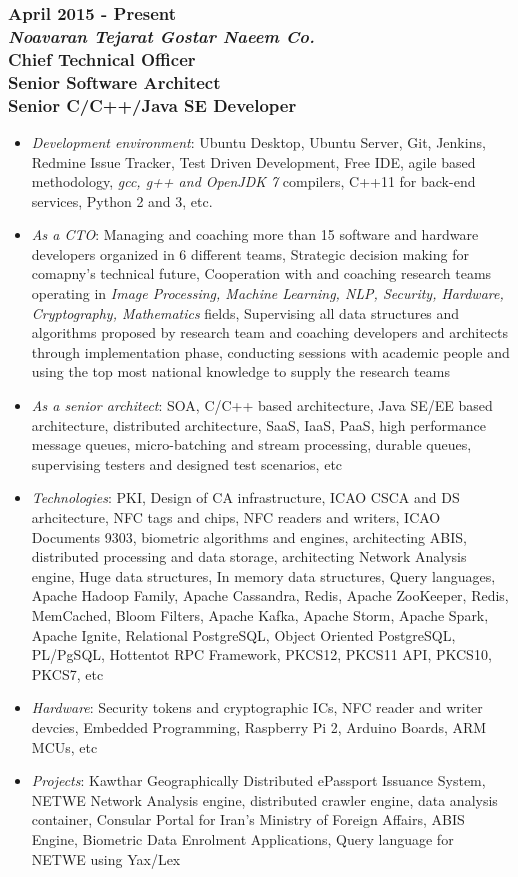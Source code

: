 \documentclass[10pt,a4paper]{article}
\begin{document}
\subsubsection{\textnormal {April 2015 - Present} \\ \textnormal {\textit {Noavaran Tejarat Gostar Naeem Co.}} \\ Chief Technical Officer \\ Senior Software Architect \\ Senior C/C++/Java SE Developer}
  \setlength{\leftskip}{0.5cm}
  \setlength{\rightskip}{1cm}
  \begin{itemize}
    \setlength{\rightskip}{1cm}
    \setlength\itemsep{0em}
    \item \small \textit {Development environment}: Ubuntu Desktop, Ubuntu Server, Git, Jenkins, Redmine Issue Tracker, Test Driven Development, Free IDE, agile based methodology, \textit {gcc, g++ and OpenJDK 7} compilers, C++11 for back-end services, Python 2 and 3, etc.
    \item \small \textit {As a CTO}: Managing and coaching more than 15 software and hardware developers organized in 6 different teams, Strategic decision making for comapny's technical future, Cooperation with and coaching research teams operating in \textit {Image Processing, Machine Learning, NLP, Security, Hardware, Cryptography, Mathematics} fields, Supervising all data structures and algorithms proposed by research team and coaching developers and architects through implementation phase, conducting sessions with academic people and using the top most national knowledge to supply the research teams
    \item \small \textit {As a senior architect}: SOA, C/C++ based architecture, Java SE/EE based architecture, distributed architecture, SaaS, IaaS, PaaS, high performance message queues, micro-batching and stream processing, durable queues, supervising testers and designed test scenarios, etc
    \item \small \textit {Technologies}: PKI, Design of CA infrastructure, ICAO CSCA and DS arhcitecture, NFC tags and chips, NFC readers and writers, ICAO Documents 9303, biometric algorithms and engines, architecting ABIS, distributed processing and data storage, architecting Network Analysis engine, Huge data structures, In memory data structures, Query languages, Apache Hadoop Family, Apache Cassandra, Redis, Apache ZooKeeper, Redis, MemCached, Bloom Filters, Apache Kafka, Apache Storm, Apache Spark, Apache Ignite, Relational PostgreSQL, Object Oriented PostgreSQL, PL/PgSQL, Hottentot RPC Framework, PKCS12, PKCS11 API, PKCS10, PKCS7, etc
    \item \small \textit {Hardware}: Security tokens and cryptographic ICs, NFC reader and writer devcies, Embedded Programming, Raspberry Pi 2, Arduino Boards, ARM MCUs, etc
    \item \small \textit {Projects}: Kawthar Geographically Distributed ePassport Issuance System, NETWE Network Analysis engine, distributed crawler engine, data analysis container, Consular Portal for Iran's Ministry of Foreign Affairs, ABIS Engine, Biometric Data Enrolment Applications, Query language for NETWE using Yax/Lex
  \end{itemize}
\end{document}
